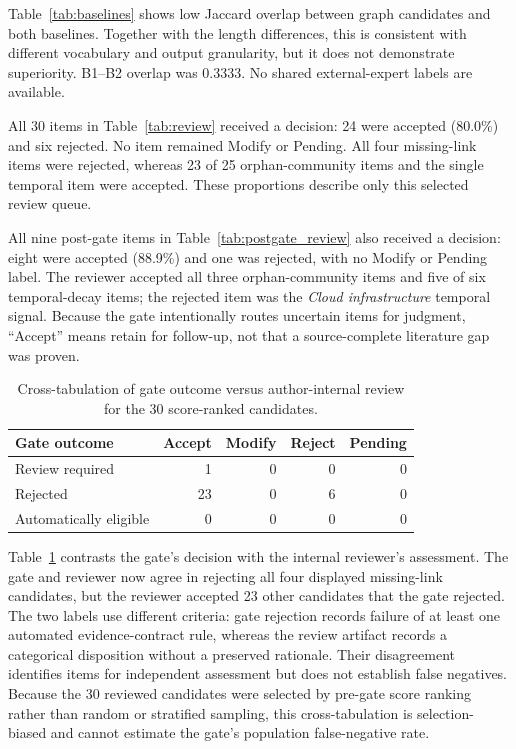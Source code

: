 \documentclass[conference, onecolumn]{IEEEtran}
\begin{document}
Table~\ref{tab:baselines} shows low Jaccard overlap between graph candidates and both baselines. Together with the length differences, this is consistent with different vocabulary and output granularity, but it does not demonstrate superiority. B1--B2 overlap was 0.3333. No shared external-expert labels are available.

All 30 items in Table~\ref{tab:review} received a decision: 24 were accepted (80.0\%) and six rejected. No item remained Modify or Pending. All four missing-link items were rejected, whereas 23 of 25 orphan-community items and the single temporal item were accepted. These proportions describe only this selected review queue.

All nine post-gate items in Table~\ref{tab:postgate_review} also received a decision: eight were accepted (88.9\%) and one was rejected, with no Modify or Pending label. The reviewer accepted all three orphan-community items and five of six temporal-decay items; the rejected item was the \emph{Cloud infrastructure} temporal signal. Because the gate intentionally routes uncertain items for judgment, ``Accept'' means retain for follow-up, not that a source-complete literature gap was proven.

\begin{table}[t]
\caption{Cross-tabulation of gate outcome versus author-internal review for the 30 score-ranked candidates.}
\label{tab:crosstab}
\centering
\begin{tabular}{lrrrr}
\toprule
Gate outcome & Accept & Modify & Reject & Pending\\
\midrule
Review required & 1 & 0 & 0 & 0\\
Rejected & 23 & 0 & 6 & 0\\
Automatically eligible & 0 & 0 & 0 & 0\\
\bottomrule
\end{tabular}
\end{table}

Table~\ref{tab:crosstab} contrasts the gate's decision with the internal reviewer's assessment. The gate and reviewer now agree in rejecting all four displayed missing-link candidates, but the reviewer accepted 23 other candidates that the gate rejected. The two labels use different criteria: gate rejection records failure of at least one automated evidence-contract rule, whereas the review artifact records a categorical disposition without a preserved rationale. Their disagreement identifies items for independent assessment but does not establish false negatives. Because the 30 reviewed candidates were selected by pre-gate score ranking rather than random or stratified sampling, this cross-tabulation is selection-biased and cannot estimate the gate's population false-negative rate.
\end{document}
